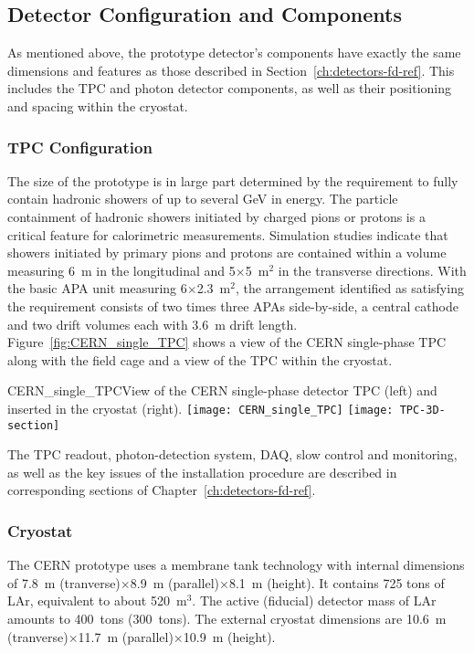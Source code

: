 \subsection{Detector Configuration and Components}

As mentioned above, the prototype detector's components have exactly
the same dimensions and features as those described in
Section~\ref{ch:detectors-fd-ref}. This includes the TPC and photon
detector components, as well as their positioning and spacing within
the cryostat.


\subsubsection{TPC Configuration}

The size of the prototype is in large part determined by the
requirement to fully contain hadronic showers of up to several GeV in
energy.  The particle containment of hadronic showers initiated by
charged pions or protons is a critical feature for calorimetric
measurements. Simulation studies indicate that showers initiated by
 primary pions and protons are contained within a volume
measuring 6~m in the longitudinal and 5$\times$5~m$^2$ in the
transverse directions. With the basic APA unit measuring
6$\times$2.3~m$^2$, the arrangement identified as satisfying the
requirement consists of two times three APAs side-by-side, a central
cathode and two drift volumes each with 3.6~m drift
length. Figure~\ref{fig:CERN_single_TPC} shows a view of the CERN
single-phase TPC along with the field cage and a view of the TPC
within the cryostat.
%
\begin{cdrfigure}{CERN_single_TPC}{View of the CERN single-phase detector TPC (left) and inserted in the cryostat (right). }
\texttt{[image: CERN\_single\_TPC]}
\texttt{[image: TPC-3D-section]}
\end{cdrfigure}
%
The TPC readout, photon-detection system, DAQ, slow control and
monitoring, as well as the key issues of the installation procedure
are described in corresponding sections of
Chapter~\ref{ch:detectors-fd-ref}.

\subsubsection{Cryostat}

The CERN prototype uses a membrane tank technology with internal
dimensions of 7.8~m (tranverse)$\times$8.9~m (parallel)$\times$8.1~m
(height).  It contains 725 tons of LAr, equivalent to about
520~m$^3$. The active (fiducial) detector mass of LAr amounts to
400~tons (300~tons).  The external cryostat dimensions are 10.6~m
(tranverse)$\times$11.7~m (parallel)$\times$10.9~m (height).

